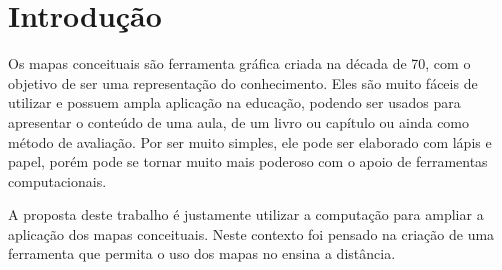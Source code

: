 \documentclass[
	12pt,				%
	openright,			%
	oneside,			%
	a4paper,			%
	english,			%
	french,				%
	spanish,			%
	brazil				%
	]{abntex2}
\begin{document}



\tableofcontents*
\cleardoublepage



\textual

\chapter{Introdução}

Os mapas conceituais são ferramenta gráfica criada na década de 70, com o objetivo de ser uma representação do conhecimento. Eles são muito fáceis de utilizar e possuem ampla aplicação na educação, podendo ser usados para apresentar o conteúdo de uma aula, de um livro ou capítulo ou ainda como método de avaliação. Por ser muito simples, ele pode ser elaborado com lápis e papel, porém pode se tornar muito mais poderoso com o apoio de ferramentas computacionais.

A proposta deste trabalho é justamente utilizar a computação para ampliar a aplicação dos mapas conceituais. Neste contexto foi pensado na criação de uma ferramenta que permita o uso dos mapas no ensina a distância. 
\end{document}
